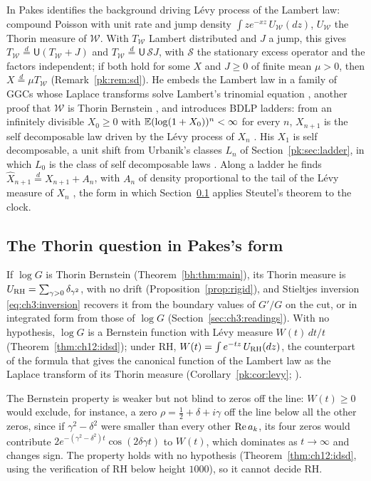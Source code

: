 In \cite{Pakes26} Pakes identifies the background driving L\'evy process of the Lambert law: compound Poisson with unit rate and jump density $\int ze^{-xz}\,U_{\mathcal W}(dz)$, $U_{\mathcal W}$ the Thorin measure of $\mathcal W$. With $T_{\mathcal W}$ Lambert distributed and $J$ a jump, this gives $T_{\mathcal W}\stackrel d=\mathsf U(T_{\mathcal W}+J)$ and $T_{\mathcal W}\stackrel d=\mathsf U\,\mathcal SJ$, with $\mathcal S$ the stationary excess operator and the factors independent; if both hold for some $X$ and $J\ge0$ of finite mean $\mu>0$, then $X\stackrel d=\mu T_{\mathcal W}$ \cite[Theorem 1]{Pakes26} (Remark~\ref{pk:rem:sd}). He embeds the Lambert law in a family of GGCs whose Laplace transforms solve Lambert's trinomial equation \cite[Theorem 6]{Pakes26}, another proof that $\mathcal W$ is Thorin Bernstein \cite[Corollary 2]{Pakes26}, and introduces BDLP ladders: from an infinitely divisible $X_0\ge0$ with $\mathbb{E}(\log(1+X_0))^n<\infty$ for every $n$, $X_{n+1}$ is the self decomposable law driven by the L\'evy process of $X_n$ \cite[Section 5]{Pakes26}. His $X_1$ is self decomposable, a unit shift from Urbanik's classes $L_n$ of Section~\ref{pk:sec:ladder}, in which $L_0$ is the class of self decomposable laws \cite{Urbanik73,Sato80,BergForst83}. Along a ladder he finds $\widehat X_{n+1}\stackrel d=X_{n+1}+A_n$, with $A_n$ of density proportional to the tail of the L\'evy measure of $X_n$ \cite[(53)]{Pakes26}, the form in which Section~\ref{pk:sec:form} applies Steutel's theorem to the clock.

\subsection{The Thorin question in Pakes's form}\label{pk:sec:form}

If $\log G$ is Thorin Bernstein (Theorem~\ref{bh:thm:main}), its Thorin measure is $U_{\mathrm{RH}}=\sum_{\gamma>0}\delta_{\gamma^2}$, with no drift (Proposition~\ref{prop:rigid}), and Stieltjes inversion \eqref{eq:ch3:inversion} recovers it from the boundary values of $G'/G$ on the cut, or in integrated form from those of $\log G$ (Section~\ref{sec:ch3:readings}). With no hypothesis, $\log G$ is a Bernstein function with L\'evy measure $W(t)\,dt/t$ (Theorem~\ref{thm:ch12:idsd}); under RH, $W(t)=\int e^{-tz}\,U_{\mathrm{RH}}(dz)$, the counterpart of the formula that gives the canonical function of the Lambert law as the Laplace transform of its Thorin measure (Corollary~\ref{pk:cor:levy}; \cite[(12)]{Pakes26}).

The Bernstein property is weaker but not blind to zeros off the line: $W(t)\ge0$ would exclude, for instance, a zero $\rho=\frac12+\delta+i\gamma$ off the line below all the other zeros, since if $\gamma^2-\delta^2$ were smaller than every other $\operatorname{Re} a_k$, its four zeros would contribute $2e^{-(\gamma^2-\delta^2)t}\cos(2\delta\gamma t)$ to $W(t)$, which dominates as $t\to\infty$ and changes sign. The property holds with no hypothesis (Theorem~\ref{thm:ch12:idsd}, using the verification of RH below height $1000$), so it cannot decide RH.

